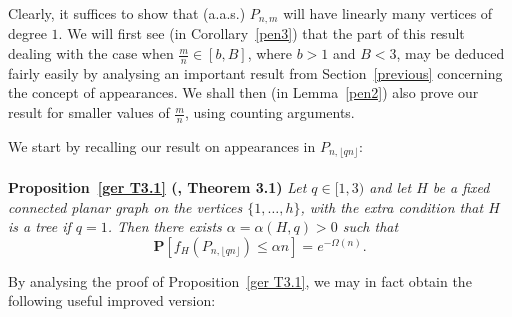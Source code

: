 \documentclass{article}
\newtheorem{Proof of Theorem}{Proof of Theorem}
\begin{document}
Clearly, it suffices to show that (a.a.s.) $P_{n,m}$ will have linearly many vertices of degree $1$.
We will first see (in Corollary~\ref{pen3}) 
that the part of this result dealing with the case when $\frac{m}{n} \in [b,B]$,
where $b>1$ and $B<3$,
may be deduced fairly easily by analysing an important result from Section~\ref{previous}
concerning the concept of appearances.
We shall then (in Lemma~\ref{pen2}) also prove our result for smaller values of $\frac{m}{n}$, using counting arguments. 





\begin{figure}[omitted: a diagram of this paper's results, not reproduced here]\end{figure} 

\phantom{p}





We start by recalling our result on appearances in $P_{n, \lfloor qn \rfloor}$: \\
\\
\textbf{Proposition~\ref{ger T3.1} (\cite{ger}, Theorem 3.1)} 
\textit{Let $q \in [1,3)$ and let $H$ be a fixed connected planar graph on the vertices $\{1, \ldots ,h\}$, 
with the extra condition that $H$ is a tree if $ q=1$.
Then there exists $\alpha= \alpha(H,q)>0$ such that} 
\begin{displaymath}
\mathbf{P} \left[f_{H} \left( P_{n, \lfloor qn \rfloor} \right) \leq \alpha n \right] = e^{- \Omega (n)}. 
\end{displaymath} 















By analysing the proof of Proposition~\ref{ger T3.1}, we may in fact obtain the following useful improved version: 
\end{document}
